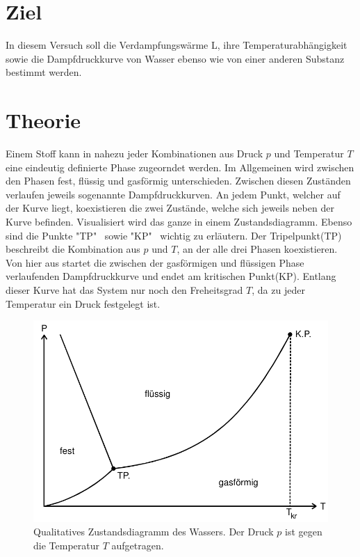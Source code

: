\section{Ziel}
In diesem Versuch soll die Verdampfungswärme L, ihre Temperaturabhängigkeit sowie die Dampfdruckkurve
von Wasser ebenso wie von einer anderen Substanz bestimmt werden.
\section{Theorie}
\label{sec:Theorie}
\cite{sample}
Einem Stoff kann in nahezu jeder Kombinationen aus Druck $p$ und Temperatur $T$ eine eindeutig definierte Phase zugeorndet werden.
Im Allgemeinen wird zwischen den Phasen fest, flüssig und gasförmig unterschieden. Zwischen diesen Zuständen verlaufen jeweils
sogenannte Dampfdruckkurven. An jedem Punkt, welcher auf der Kurve liegt, koexistieren die zwei Zustände, welche sich jeweils neben der Kurve befinden.
Visualisiert  wird das ganze in einem Zustandsdiagramm. Ebenso sind die Punkte "TP" \, sowie "KP" \, wichtig zu erläutern. Der Tripelpunkt(TP) beschreibt die Kombination
aus $p$ und $T$, an der alle drei Phasen koexistieren. Von hier aus startet die zwischen der gasförmigen und flüssigen Phase verlaufenden Dampfdruckkurve und
endet am kritischen Punkt(KP). Entlang dieser Kurve hat das System nur noch den Freheitsgrad  $T$, da zu jeder Temperatur ein Druck festgelegt ist.
\begin{figure}[h]
    \centering
    \includegraphics[scale=0.8]{"screen.jpg"}
    \caption{Qualitatives Zustandsdiagramm des Wassers. Der Druck $p$ ist gegen die Temperatur $T$ aufgetragen.}
    \label{Abb1:Zustandsdiagramm}
\end{figure}
